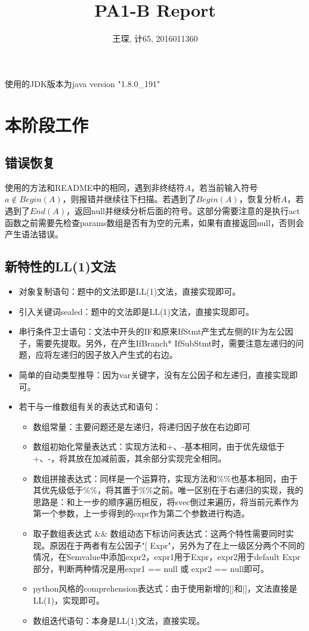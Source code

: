 \documentclass{article}
\title{\fontsize{18}\baselineskip PA1-B Report}
\author{\fontsize{10} \baselineskip 王琛, 计65, 2016011360}
\date{}
\begin{document}
\maketitle
使用的JDK版本为java version "1.8.0\_191"

\section{本阶段工作}
\subsection{错误恢复}
使用的方法和README中的相同，遇到非终结符$A$，若当前输入符号$a \notin Begin(A)$，则报错并继续往下扫描。若遇到了$Begin(A)$，恢复分析$A$，若遇到了$End(A)$，返回null并继续分析后面的符号。这部分需要注意的是执行act函数之前需要先检查params数组是否有为空的元素，如果有直接返回null，否则会产生语法错误。

\subsection{新特性的LL(1)文法}
\begin{itemize}
    \item 对象复制语句：题中的文法即是LL(1)文法，直接实现即可。
    \item 引入关键词\textmd{sealed}：题中的文法即是LL(1)文法，直接实现即可。
    \item 串行条件卫士语句：文法中开头的IF和原来IfStmt产生式左侧的IF为左公因子，需要先提取。另外，在产生IfBranch* IfSubStmt时，需要注意左递归的问题，应将左递归的因子放入产生式的右边。
    \item 简单的自动类型推导：因为var关键字，没有左公因子和左递归，直接实现即可。
    \item 若干与一维数组有关的表达式和语句：
        \begin{itemize}
            \item 数组常量：主要问题还是左递归，将递归因子放在右边即可
            \item 数组初始化常量表达式：实现方法和+、-基本相同，由于优先级低于+、-，将其放在加减前面，其余部分实现完全相同。
            \item 数组拼接表达式：同样是一个运算符，实现方法和\%\%也基本相同，由于其优先级低于\%\%，将其置于\%\%之前。唯一区别在于右递归的实现，我的思路是：和上一步的顺序遍历相反，将svec倒过来遍历，将当前元素作为第一个参数，上一步得到的expr作为第二个参数进行构造。
            \item 取子数组表达式 \&\& 数组动态下标访问表达式：这两个特性需要同时实现。原因在于两者有左公因子"[ Expr"，另外为了在上一级区分两个不同的情况，在Semvalue中添加expr2，expr1用于Expr，expr2用于default Expr部分，判断两种情况是用expr1 == null 或 expr2 == null即可。
            \item python风格的comprehension表达式：由于使用新增的[|和|]，文法直接是LL(1)，实现即可。
            \item 数组迭代语句：本身是LL(1)文法，直接实现。
        \end{itemize}
\end{itemize}
\end{document}
